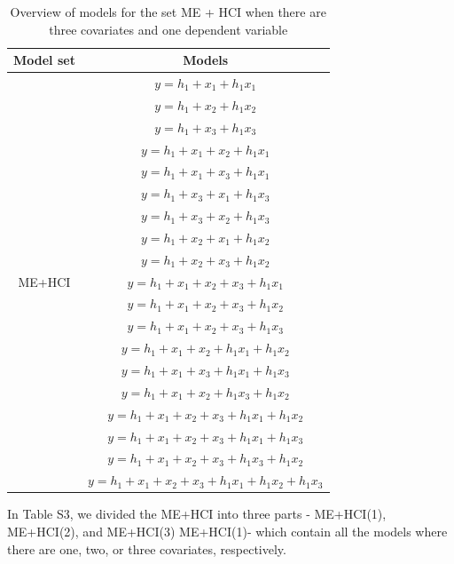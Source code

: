 \begin{table}[hbt!]
\caption{}
\caption*{Overview of models for the set ME + HCI when there are three covariates and one dependent variable}
\centering
\begin{tabular}{cc}
\toprule
Model set & Models \\ 
\midrule
\multirow{19}{*}{ME+HCI} & $y=h_1+x_1+h_1x_1$\\ &  $y=h_1+x_2+h_1x_2$\\ &  $y=h_1+x_3+h_1x_3$\\ & $y=h_1+x_1+x_2+h_1x_1$\\ & $y=h_1+x_1+x_3+h_1x_1$\\ & $y=h_1+x_3+x_1+h_1x_3$\\ & $y=h_1+x_3+x_2+h_1x_3$\\ & $y=h_1+x_2+x_1+h_1x_2$\\ & $y=h_1+x_2+x_3+h_1x_2$\\ & $y=h_1+x_1+x_2+x_3+h_1x_1$\\ & $y=h_1+x_1+x_2+x_3+h_1x_2$\\ & $y=h_1+x_1+x_2+x_3+h_1x_3$\\ & $y=h_1+x_1+x_2+h_1x_1+h_1x_2$\\ & $y=h_1+x_1+x_3+h_1x_1+h_1x_3$\\ & $y=h_1+x_1+x_2+h_1x_3+h_1x_2$\\ & $y=h_1+x_1+x_2+x_3+h_1x_1+h_1x_2$\\ & $y=h_1+x_1+x_2+x_3+h_1x_1+h_1x_3$\\ & $y=h_1+x_1+x_2+x_3+h_1x_3+h_1x_2$\\ & $y=h_1+x_1+x_2+x_3+h_1x_1+h_1x_2+h_1x_3$\\  
\bottomrule
\end{tabular}
\end{table}

In Table S3, we divided the ME+HCI into three parts - ME+HCI(1), ME+HCI(2), and ME+HCI(3) ME+HCI(1)- which contain all the models where there are one, two, or three covariates, respectively. \\

